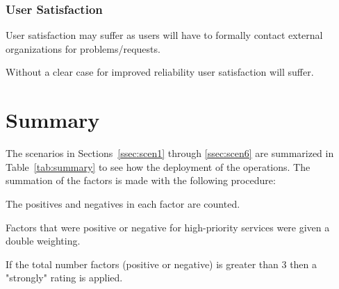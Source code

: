 \documentclass[12pt,a4paper]{article}
\begin{document}
\subsubsection*{User Satisfaction}
\bitm
\item User satisfaction may suffer as \EC users will have to formally contact external organizations for problems/requests.
  \item Without a clear case for improved reliability user satisfaction will suffer.
\eitm

\section{Summary}
\label{sec:summ}

The scenarios in Sections~\ref{ssec:scen1} through \ref{ssec:scen6} are summarized in Table~\ref{tab:summary} to see how the deployment of the \ED operations. 
The summation of the factors is made with the following procedure:
\bitm
\item The positives and negatives in each factor are counted.
\item Factors that were positive or negative for high-priority services were given a double weighting.
\item If the total number factors (positive or negative) is greater than 3 then a "strongly" rating is applied.
\eitm
\newlength{\colwid}
\setlength{\colwid}{1.45cm}
\newcommand{\facc}{0.45}
\newcommand{\faccc}{0.3}
\newlength{\pdd}
\setlength{\pdd}{3pt}
\end{document}
